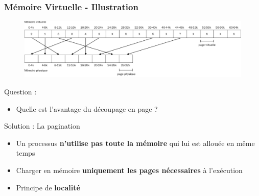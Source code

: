 \documentclass[8pt]{beamer}
\begin{document}
\begin{frame}[c]
    \frametitle{Mémoire Virtuelle - Illustration}
    \begin{figure}
        \centering

        \includegraphics[width=\textwidth]{figures/memoire_virtuelle_physique.pdf}
    \end{figure}
    \begin{alertblock}{Question : }
        \begin{itemize}
            \item
                  Quelle est l'avantage du d\'ecoupage en page ?
        \end{itemize}
    \end{alertblock}
    \pause
    \begin{exampleblock}{Solution : La pagination}
        \begin{itemize}
            \item Un processus \textbf{n'utilise pas toute la mémoire} qui
                  lui est
                  allouée en même
                  temps
            \item Charger en mémoire \textbf{uniquement les pages nécessaires}
                  à
                  l'exécution
            \item Principe de \textbf{localité}
        \end{itemize}
    \end{exampleblock}

\end{frame}
\end{document}
